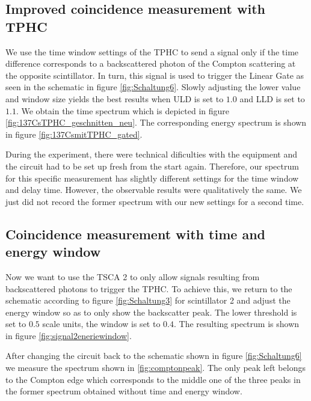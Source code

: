 \subsection{Improved coincidence measurement with TPHC}
%
We use the time window settings of the TPHC to send a signal only if the time difference corresponds to a backscattered photon of the Compton scattering at the opposite scintillator.
In turn, this signal is used to trigger the Linear Gate as seen in the schematic in figure \ref{fig:Schaltung6}.
Slowly adjusting the lower value and window size yields the best results when ULD is set to $1.0$ and LLD is set to $1.1$.
We obtain the time spectrum which is depicted in figure \ref{fig:137CsTPHC_geschnitten_neu}.
The corresponding energy spectrum is shown in figure \ref{fig:137CsmitTPHC_gated}.
%
\par
%
During the experiment, there were technical dificulties with the equipment and the circuit had to be set up fresh from the start again.
Therefore, our spectrum for this specific measurement has slightly different settings for the time window and delay time.
However, the observable results were qualitatively the same.
We just did not record the former spectrum with our new settings for a second time.
%
\subsection{Coincidence measurement with time and energy window}
%
Now we want to use the TSCA 2 to only allow signals resulting from backscattered photons to trigger the TPHC.
To achieve this, we return to the schematic according to figure \ref{fig:Schaltung3} for scintillator 2 and adjust the energy window so as to only show the backscatter peak.
The lower threshold is set to $0.5$ scale units, the window is set to $0.4$.
The resulting spectrum is shown in figure \ref{fig:signal2eneriewindow}.
%
\par
%
After changing the circuit back to the schematic shown in figure \ref{fig:Schaltung6} we measure the spectrum shown in \ref{fig:comptonpeak}.
The only peak left belongs to the Compton edge which corresponds to the middle one of the three peaks in the former spectrum obtained without time and energy window.
%
